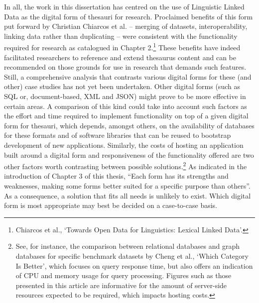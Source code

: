 In all, the work in this dissertation has centred on the use of Linguistic Linked Data as the digital form of thesauri for research. Proclaimed benefits of this form put forward by Christian Chiarcos et al. -- merging of datasets, interoperability, linking data rather than duplicating -- were consistent with the functionality required for research as catalogued in Chapter 2.\footnote{Chiarcos et al., `Towards Open Data for Linguistics: Lexical Linked Data'.} These benefits have indeed facilitated researchers to reference and extend thesaurus content and can be recommended on those grounds for use in research that demands such features. Still, a comprehensive analysis that contrasts various digital forms for these (and other) case studies has not yet been undertaken. Other digital forms (such as SQL or, document-based, XML and JSON) might prove to be more effective in certain areas. A comparison of this kind could take into account such factors as the effort and time required to implement functionality on top of a given digital form for thesauri, which depends, amongst others, on the availability of databases for these formats and of software libraries that can be reused to bootstrap development of new applications. Similarly, the costs of hosting an application built around a digital form and responsiveness of the functionality offered are two other factors worth contrasting between possible solutions.\footnote{See, for instance, the comparison between relational databases and graph databases for specific benchmark datasets by Cheng et al., `Which Category Is Better', which focuses on query response time, but also offers an indication of CPU and memory usage for query processing. Figures such as those presented in this article are informative for the amount of server-side resources expected to be required, which impacts hosting costs.} As indicated in the introduction of Chapter 3 of this thesis, ``Each form has its strengths and weaknesses, making some forms better suited for a specific purpose than others''. As a consequence, a solution that fits all needs is unlikely to exist. Which digital form is most appropriate may best be decided on a case-to-case basis.



